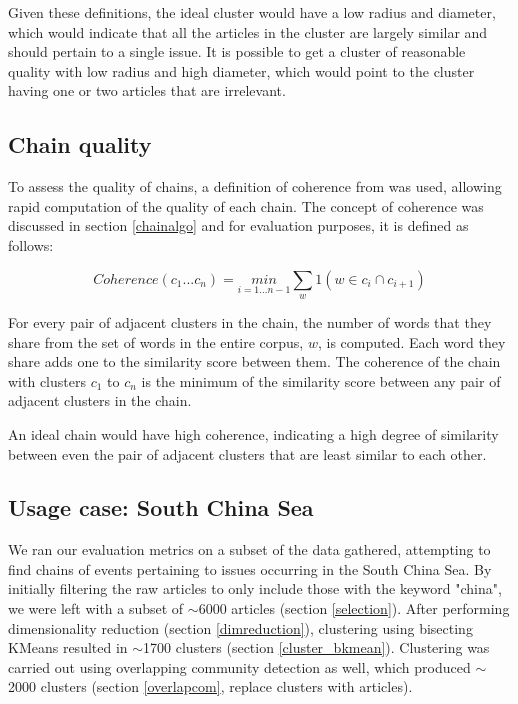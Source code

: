 \documentclass[12pt]{article}
\begin{document}
Given these definitions, the ideal cluster would have a low radius and diameter, which would indicate that all the articles in the cluster are largely similar and should pertain to a single issue. It is possible to get a cluster of reasonable quality with low radius and high diameter, which would point to the cluster having one or two articles that are irrelevant.

\subsection{Chain quality} \label{coherence}
To assess the quality of chains, a definition of coherence from \cite{connectingdots} was used, allowing rapid computation of the quality of each chain. The concept of coherence was discussed in section \ref{chainalgo} and for evaluation purposes, it is defined as follows:

\begin{equation}
Coherence(c_1...c_n)= \underset{i=1...n-1}{min} \sum_w{1(w \in c_i \cap c_{i+1})}
\end{equation}

For every pair of adjacent clusters in the chain, the number of words that they share from the set of words in the entire corpus, $w$, is computed. Each word they share adds one to the similarity score between them. The coherence of the chain with clusters $c_1$ to $c_n$ is the minimum of the similarity score between any pair of adjacent clusters in the chain.

An ideal chain would have high coherence, indicating a high degree of similarity between even the pair of adjacent clusters that are least similar to each other.

\subsection{Usage case: South China Sea}
We ran our evaluation metrics on a subset of the data gathered, attempting to find chains of events pertaining to issues occurring in the South China Sea. By initially filtering the raw articles to only include those with the keyword "china", we were left with a subset of $\sim$6000 articles (section \ref{selection}). After performing dimensionality reduction (section \ref{dimreduction}), clustering using bisecting KMeans resulted in $\sim$1700 clusters (section \ref{cluster_bkmean}). Clustering was carried out using overlapping community detection as well, which produced $\sim$2000 clusters (section \ref{overlapcom}, replace clusters with articles).
\end{document}
